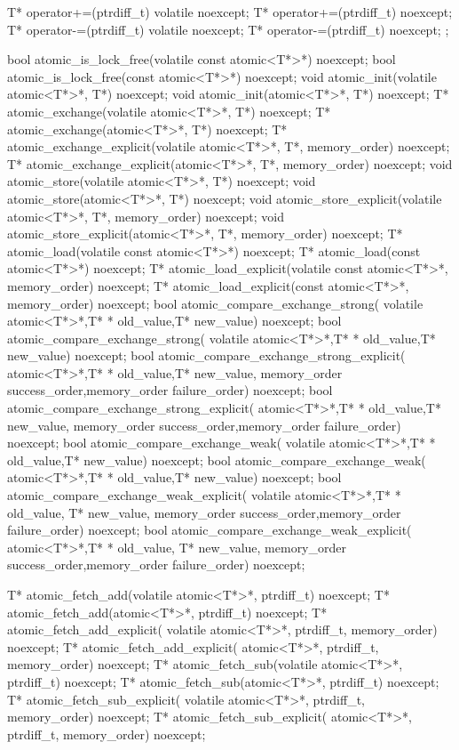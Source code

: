 \begin{cpp}
{  T* operator+=(ptrdiff_t) volatile noexcept;
  T* operator+=(ptrdiff_t) noexcept;
  T* operator-=(ptrdiff_t) volatile noexcept;
  T* operator-=(ptrdiff_t) noexcept;
};

bool atomic_is_lock_free(volatile const atomic<T*>*) noexcept;
bool atomic_is_lock_free(const atomic<T*>*) noexcept;
void atomic_init(volatile atomic<T*>*, T*) noexcept;
void atomic_init(atomic<T*>*, T*) noexcept;
T* atomic_exchange(volatile atomic<T*>*, T*) noexcept;
T* atomic_exchange(atomic<T*>*, T*) noexcept;
T* atomic_exchange_explicit(volatile atomic<T*>*, T*, memory_order)
  noexcept;
T* atomic_exchange_explicit(atomic<T*>*, T*, memory_order) noexcept;
void atomic_store(volatile atomic<T*>*, T*) noexcept;
void atomic_store(atomic<T*>*, T*) noexcept;
void atomic_store_explicit(volatile atomic<T*>*, T*, memory_order)
  noexcept;
void atomic_store_explicit(atomic<T*>*, T*, memory_order) noexcept;
T* atomic_load(volatile const atomic<T*>*) noexcept;
T* atomic_load(const atomic<T*>*) noexcept;
T* atomic_load_explicit(volatile const atomic<T*>*, memory_order) noexcept;
T* atomic_load_explicit(const atomic<T*>*, memory_order) noexcept;
bool atomic_compare_exchange_strong(
  volatile atomic<T*>*,T* * old_value,T* new_value) noexcept;
bool atomic_compare_exchange_strong(
  volatile atomic<T*>*,T* * old_value,T* new_value) noexcept;
bool atomic_compare_exchange_strong_explicit(
  atomic<T*>*,T* * old_value,T* new_value,
  memory_order success_order,memory_order failure_order) noexcept;
bool atomic_compare_exchange_strong_explicit(
  atomic<T*>*,T* * old_value,T* new_value,
  memory_order success_order,memory_order failure_order) noexcept;
bool atomic_compare_exchange_weak(
  volatile atomic<T*>*,T* * old_value,T* new_value) noexcept;
bool atomic_compare_exchange_weak(
  atomic<T*>*,T* * old_value,T* new_value) noexcept;
bool atomic_compare_exchange_weak_explicit(
  volatile atomic<T*>*,T* * old_value, T* new_value,
  memory_order success_order,memory_order failure_order) noexcept;
bool atomic_compare_exchange_weak_explicit(
  atomic<T*>*,T* * old_value, T* new_value,
  memory_order success_order,memory_order failure_order) noexcept;

T* atomic_fetch_add(volatile atomic<T*>*, ptrdiff_t) noexcept;
T* atomic_fetch_add(atomic<T*>*, ptrdiff_t) noexcept;
T* atomic_fetch_add_explicit(
  volatile atomic<T*>*, ptrdiff_t, memory_order) noexcept;
T* atomic_fetch_add_explicit(
  atomic<T*>*, ptrdiff_t, memory_order) noexcept;
T* atomic_fetch_sub(volatile atomic<T*>*, ptrdiff_t) noexcept;
T* atomic_fetch_sub(atomic<T*>*, ptrdiff_t) noexcept;
T* atomic_fetch_sub_explicit(
  volatile atomic<T*>*, ptrdiff_t, memory_order) noexcept;
T* atomic_fetch_sub_explicit(
  atomic<T*>*, ptrdiff_t, memory_order) noexcept;
\end{cpp}

